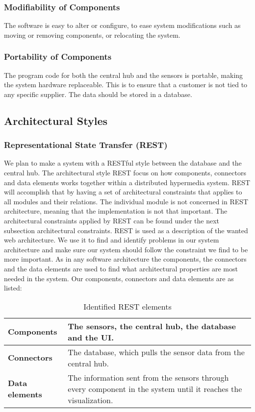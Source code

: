 \documentclass[../document.tex]{subfiles}
\begin{document}
\subsubsection{Modifiability of Components}
The software is easy to alter or configure, to ease system modifications such as moving or removing components, or relocating the system.

\subsubsection{Portability of Components}
The program code for both the central hub and the sensors is portable, making the system hardware replaceable. This is to ensure that a customer is not tied to any specific supplier. The data should be stored in a database.

\subsection{Architectural Styles}
\subsubsection{Representational State Transfer (REST)}
We plan to make a system with a RESTful style \cite{rest} between the database and the central hub. The architectural style \gls{REST} focus on how components, connectors and data elements works together within a distributed hypermedia system. \gls{REST} will accomplish that by having a set of architectural constraints that applies to all modules and their relations. The individual module is not concerned in \gls{REST} architecture, meaning that the implementation is not that important. The architectural constraints applied by \gls{REST} can be found under the next subsection architectural constraints. \gls{REST} is used as a description of the wanted web architecture. We use it to find and identify problems in our system architecture and make sure our system should follow the constraint we find to be more important. As in any software architecture the components, the connectors and the data elements are used to find what architectural properties are most needed in the system. Our components, connectors and data elements are as listed:

\begin{table}[H]
	\caption{Identified \gls{REST} elements}
	\begin{tabularx}{\textwidth}{|X|X|}
		\hline
		\textbf{Components}		& The sensors, the central hub, the database and the UI.  \\ \hline
		\textbf{Connectors}		& The database, which pulls the sensor data from the central hub.  \\ \hline
		\textbf{Data elements}	& The information sent from the sensors through every component in the system until it reaches  the visualization.  \\ \hline
	\end{tabularx}
\end{table}
\end{document}
